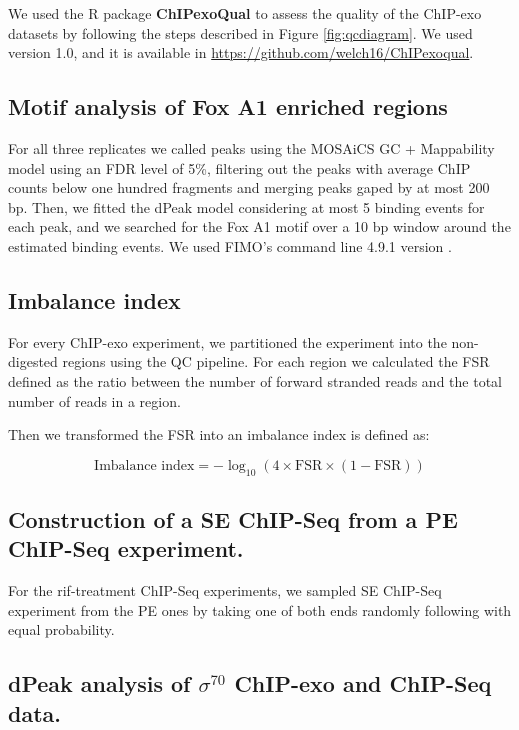 \documentclass{bmcart}\usepackage[]{graphicx}\usepackage[]{color}
\newcommand{\sig}{\sigma^{70}}
\begin{document}
We used the R package \textbf{ChIPexoQual} to assess the quality of
the ChIP-exo datasets by following the steps described in Figure
\ref{fig:qcdiagram}. We used version 1.0, and it is available in
\url{https://github.com/welch16/ChIPexoqual}.

\subsection*{Motif analysis of Fox A1 enriched regions}

For all three replicates we called peaks using the MOSAiCS GC +
Mappability model using an FDR level of 5\%, filtering out the peaks
with average ChIP counts below one hundred fragments and merging peaks
gaped by at most 200 bp. Then, we fitted the dPeak model considering
at most 5 binding events for each peak, and we searched for the Fox A1
motif over a 10 bp window around the estimated binding events. We used
FIMO's command line 4.9.1 version \cite{fimo}.

\subsection*{Imbalance index}

For every ChIP-exo experiment, we partitioned the experiment into the
non-digested regions using the QC pipeline. For each region we
calculated the FSR defined as the ratio between the number of forward
stranded reads and the total number of reads in a region. 

Then we
transformed the FSR into an imbalance index is defined as:

\[
\mbox{Imbalance index} = -\log_{10} (4 \times \mbox{FSR} \times (1 - \mbox{FSR}))
\]

\subsection*{Construction of a SE ChIP-Seq from a PE ChIP-Seq experiment.}

For the rif-treatment ChIP-Seq experiments, we sampled SE ChIP-Seq
experiment from the PE ones by taking one of both ends randomly
following with equal probability.

\subsection*{dPeak analysis of $\sig$ ChIP-exo and ChIP-Seq data.}
\end{document}
